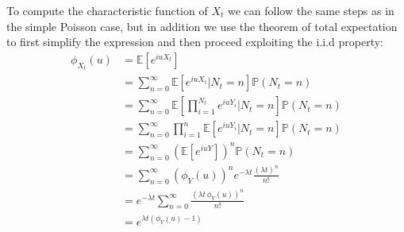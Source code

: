\bigskip
To compute the characteristic function of $X_t$ we can follow the same steps as in the simple Poisson case, but in addition we use the theorem of total expectation to first simplify the expression and then proceed exploiting the i.i.d property:
\begin{equation*} 
	\begin{split}
	\phi_{X_t}(u) & = \mathbb{E}[e^{iu X_t}]\\
	&= \sum_{n=0}^{\infty} \mathbb{E}[e^{iu X_t}| N_t = n] \mathbb{P}( N_t = n)\\
	&= \sum_{n=0}^{\infty} \mathbb{E}[\prod_{i=1}^{N_t}e^{iu Y_i}| N_t = n] \mathbb{P}( N_t = n)\\
	& = \sum_{n=0}^{\infty} \prod_{i=1}^{n}\mathbb{E}[e^{iu Y_i}| N_t = n] \mathbb{P}( N_t = n)\\
	&= \sum_{n=0}^{\infty} (\mathbb{E}[e^{iu Y}])^n \mathbb{P}( N_t = n)\\
	&= \sum_{n=0}^{\infty}(\phi_Y(u))^n e^{-\lambda t}\frac{(\lambda t)^n}{n!}\\
	&= e^{-\lambda t}\sum_{n=0}^{\infty}\frac{(\lambda t \, \phi_Y(u))^n}{n!}\\
	&=e^{\lambda t (\phi_Y(u)-1)}
	\end{split}
\end{equation*}
